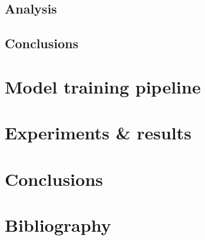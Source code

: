 \documentclass[11pt, a4paper]{article}
\begin{document}
	\subsection{Analysis}
	\subsection{Conclusions}
	
	\section{Model training pipeline}
	\section{Experiments \& results}
	\section{Conclusions}
	\section{Bibliography}

	
	
\end{document}
